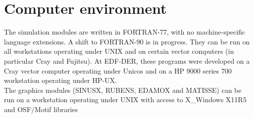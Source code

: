 \section{Computer environment}

The simulation modules are written in FORTRAN-77, with no machine-specific
language extensions. A shift to FORTRAN-90 is in progress. They can be run on
all workstations operating under UNIX and on certain vector computers (in
particular Cray and Fujitsu). At EDF-DER, these programs were developed on a
Cray vector computer operating under Unicos and on a HP 9000 series 700
workstation operating under HP-UX.\\
The graphics modules (SINUSX, RUBENS, EDAMOX and MATISSE) can be run on a
workstation operating under UNIX with access to X\_Windows X11R5 and OSF/Motif
libraries

